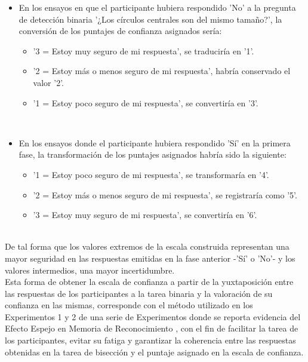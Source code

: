 \begin{itemize}
\begin{itemize}
\begin{itemize}
\item En los ensayos en que el participante hubiera respondido 'No' a la pregunta de detección binaria '¿Los círculos centrales son del mismo tamaño?', la conversión de los puntajes de confianza asignados sería:\\
	\begin{itemize}
	\item '3 = Estoy muy seguro de mi respuesta', se traduciría en '1'.\\
	\item '2 = Estoy más o menos seguro de mi respuesta', habría conservado el valor '2'.\\
	\item '1 = Estoy poco seguro de mi respuesta', se convertiría en '3'.\\
	\end{itemize}
\\
\item En los ensayos donde el participante hubiera respondido 'Sí' en la primera fase, la transformación de los puntajes asignados habría sido la siguiente:\\
	\begin{itemize}
	\item '1 = Estoy poco seguro de mi respuesta', se transformaría en '4'.\\
	\item '2 = Estoy más o menos seguro de mi respuesta', se registraría como '5'.\\
	\item '3 = Estoy muy seguro de mi respuesta', se convertiría en '6'.\\
	\end{itemize}
\end{itemize}\\

De tal forma que los valores extremos de la escala construida representan una mayor seguridad en las respuestas emitidas en la fase anterior -'Sí' o 'No'- y los valores intermedios, una mayor incertidumbre.\\

Esta forma de obtener la escala de confianza a partir de la yuxtaposición entre las respuestas de los participantes a la tarea binaria y la valoración de su confianza en las mismas, corresponde con el método utilizado en los Experimentos 1 y 2 de una serie de Experimentos donde se reporta evidencia del Efecto Espejo  en Memoria de Reconocimiento \parencite{Glanzer1990}, con el fin de facilitar la tarea de los participantes, evitar su fatiga y garantizar la coherencia entre las respuestas obtenidas en la tarea de bisección y el puntaje asignado en la escala de confianza.\\


\end{itemize}
\end{itemize}
